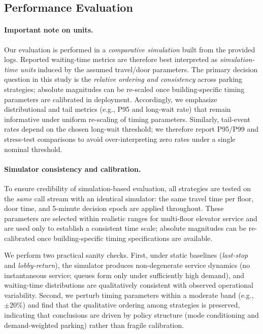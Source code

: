 
\subsection{Performance Evaluation}

\paragraph{Important note on units.}
Our evaluation is performed in a \emph{comparative simulation} built from the provided logs. Reported waiting-time metrics are therefore best interpreted as \emph{simulation-time units} induced by the assumed travel/door parameters. The primary decision question in this study is the \emph{relative ordering and consistency} across parking strategies; absolute magnitudes can be re-scaled once building-specific timing parameters are calibrated in deployment. Accordingly, we emphasize distributional and tail metrics (e.g., P95 and long-wait rate) that remain informative under uniform re-scaling of timing parameters.
Similarly, tail-event rates depend on the chosen long-wait threshold; we therefore report P95/P99 and stress-test comparisons to avoid over-interpreting zero rates under a single nominal threshold.


\paragraph{Simulator consistency and calibration.}
To ensure credibility of simulation-based evaluation, all strategies are tested on the \emph{same} call stream with an identical simulator:
the same travel time per floor, door time, and 5-minute decision epoch are applied throughout. These parameters are selected within
realistic ranges for multi-floor elevator service and are used only to establish a consistent time scale; absolute magnitudes can be
re-calibrated once building-specific timing specifications are available.

We perform two practical sanity checks. First, under static baselines (\emph{last-stop} and \emph{lobby-return}), the simulator produces
non-degenerate service dynamics (no instantaneous service; queues form only under sufficiently high demand), and waiting-time distributions
are qualitatively consistent with observed operational variability. Second, we perturb timing parameters within a moderate band (e.g.,
$\pm 20\%$) and find that the qualitative ordering among strategies is preserved, indicating that conclusions are driven by policy structure
(mode conditioning and demand-weighted parking) rather than fragile calibration.


